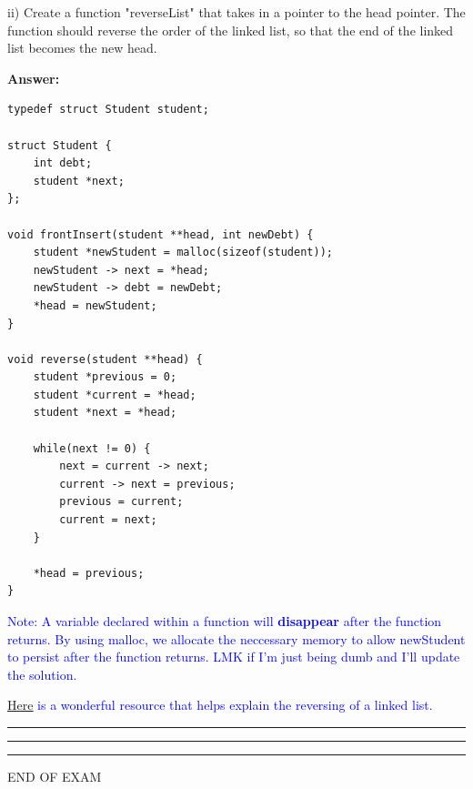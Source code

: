 \documentclass{exam}
\begin{document}
ii) Create a function "reverseList" that takes in a pointer to the head pointer. The function should reverse the order of the linked list, so that the end of the linked list becomes the new head.

\textbf{Answer:}

\begin{lstlisting}
typedef struct Student student;

struct Student {
	int debt;
	student *next;
};

void frontInsert(student **head, int newDebt) {
	student *newStudent = malloc(sizeof(student));
	newStudent -> next = *head;
	newStudent -> debt = newDebt;
	*head = newStudent;
}

void reverse(student **head) {
	student *previous = 0;
	student *current = *head;
	student *next = *head;
	
	while(next != 0) {
		next = current -> next;
		current -> next = previous;
		previous = current;
		current = next;
	}

	*head = previous;
}
\end{lstlisting}

\textcolor{blue}{Note: A variable declared within a function will \textbf{disappear} after the function returns. By using malloc, we allocate the neccessary memory to allow newStudent to persist after the function returns. LMK if I'm just being dumb and I'll update the solution.}

\textcolor{blue}{\href{https://www.geeksforgeeks.org/reverse-a-linked-list/}{\underline{Here}} is a wonderful resource that helps explain the reversing of a linked list.}

\newpage

\begin{center}\noindent\rule{6in}{0.4pt}\end{center}

\newpage

\begin{center}\noindent\rule{6in}{0.4pt}\end{center}

\begin{center}\noindent\rule{6in}{0.4pt}\end{center}

\vspace{5px}

\begin{center} END OF EXAM \end{center}
\end{document}
